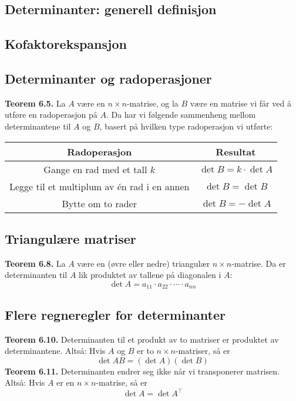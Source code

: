 \documentclass{article}
\begin{document}
\subsection{Determinanter: generell definisjon}


\subsection{Kofaktorekspansjon}


\subsection{Determinanter og radoperasjoner}
\textbf{Teorem 6.5.} La $A$ være en $n \times n$-matrise, og la $B$ være en matrise vi får ved å utføre en radoperasjon på $A$. Da har vi følgende sammenheng mellom determinantene til $A$ og $B$, basert på hvilken type radoperasjon vi utførte:
\begin{table}[h]
    \centering
    \begin{tabular}{c|c}
        Radoperasjon & Resultat \\
        \hline 
        Gange en rad med et tall $k$ & $\det{B} = k \cdot \det{A}$ \\
        Legge til et multiplum av én rad i en annen & $\det{B} = \det{B}$ \\
        Bytte om to rader & $\det{B} = -\det{A}$
    \end{tabular}
\end{table}


\subsection{Triangulære matriser}
\textbf{Teorem 6.8.} La $A$ være en (øvre eller nedre) triangulær $n \times n$-matrise. Da er determinanten til $A$ lik produktet av tallene på diagonalen i $A$:
\[ \det{A} = a_{11} \cdot a_{22} \cdot \cdots \cdot a_{nn} \]


\subsection{Flere regneregler for determinanter}
\textbf{Teorem 6.10.} Determinanten til et produkt av to matriser er produktet av determinantene. Altså: Hvis $A$ og $B$ er to $n \times n$-matriser, så er
\[ \det{AB} = (\det{A})(\det{B}) \]
\textbf{Teorem 6.11.} Determinanten endrer seg ikke når vi transponerer matrisen. Altså: Hvis $A$ er en $n \times n$-matrise, så er
\[ \det{A} = \det{A^{\top}} \]
\end{document}
